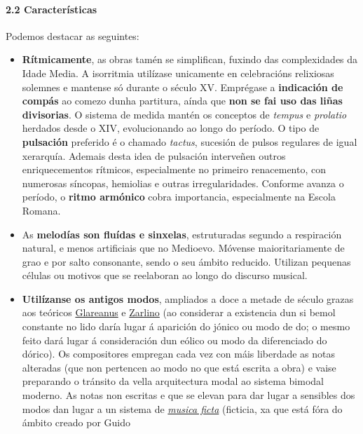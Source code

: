 \documentclass[
]{article}
\begin{document}
\hypertarget{22-caracteruxedsticas}{%
\paragraph{2.2 Características}\label{22-caracteruxedsticas}}

Podemos destacar as seguintes:

\begin{itemize}
\item
  \textbf{Rítmicamente}, as obras tamén se simplifican, fuxindo das
  complexidades da Idade Media. A isorritmia utilízase unicamente en
  celebracións relixiosas solemnes e mantense só durante o século XV.
  Emprégase a \textbf{indicación de compás} ao comezo dunha partitura,
  aínda que \textbf{non se fai uso das liñas divisorias}. O sistema de
  medida mantén os conceptos de \emph{tempus} e \emph{prolatio} herdados
  desde o XIV, evolucionando ao longo do período. O tipo de
  \textbf{pulsación} preferido é o chamado \emph{tactus}, sucesión de
  pulsos regulares de igual xerarquía. Ademais desta idea de pulsación
  interveñen outros enriquecementos rítmicos, especialmente no primeiro
  renacemento, con numerosas síncopas, hemiolias e outras
  irregularidades. Conforme avanza o período, o \textbf{ritmo armónico}
  cobra importancia, especialmente na Escola Romana.
\item
  As \textbf{melodías son fluídas e sinxelas}, estruturadas segundo a
  respiración natural, e menos artificiais que no Medioevo. Móvense
  maioritariamente de grao e por salto consonante, sendo o seu ámbito
  reducido. Utilizan pequenas células ou motivos que se reelaboran ao
  longo do discurso musical.
\item
  \textbf{Utilízanse os antigos modos}, ampliados a doce a metade de
  século grazas aos teóricos
  \href{http://es.wikipedia.org/wiki/Glareanus}{Glareanus} e
  \href{http://es.wikipedia.org/wiki/Gioseffo_Zarlino}{Zarlino} (ao
  considerar a existencia dun si bemol constante no lido daría lugar á
  aparición do jónico ou modo de do; o mesmo feito dará lugar á
  consideración dun eólico ou modo da diferenciado do dórico). Os
  compositores empregan cada vez con máis liberdade as notas alteradas
  (que non pertencen ao modo no que está escrita a obra) e vaise
  preparando o tránsito da vella arquitectura modal ao sistema bimodal
  moderno. As notas non escritas e que se elevan para dar lugar a
  sensibles dos modos dan lugar a un sistema de
  \href{http://es.wikipedia.org/wiki/M\%C3\%BAsica_ficta}{\emph{musica
  ficta}} (ficticia, xa que está fóra do ámbito creado por Guido

\end{itemize}
\end{document}
